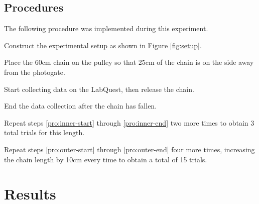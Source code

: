 \documentclass[stu,biblatex,floatsintext,draftall]{apa7}
\begin{document}
\subsection{Procedures}
The following procedure was implemented during this experiment.
\begin{APAenumerate}
	\item Construct the experimental setup as shown in Figure \ref{fig:setup}.
	\item\label{pro:outer-start} Place the 60\unit{\centi\meter} chain on the pulley so that 25\unit{\centi\meter} of the chain is on the side away from the photogate.
	\item\label{pro:inner-start} Start collecting data on the LabQuest, then release the chain.
	\item\label{pro:inner-end} End the data collection after the chain has fallen.
	\item\label{pro:outer-end} Repeat steps \ref{pro:inner-start} through \ref{pro:inner-end} two more times to obtain 3 total trials for this length.
	\item Repeat steps \ref{pro:outer-start} through \ref{pro:outer-end} four more times, increasing the chain length by 10\unit{\centi\meter} every time to obtain a total of 15 trials.
\end{APAenumerate}

\section{Results}
\end{document}
